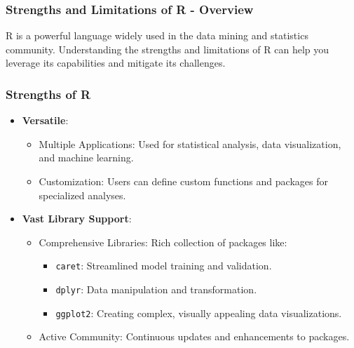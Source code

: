 \documentclass[aspectratio=169]{beamer}
\begin{document}
\begin{frame}[fragile]
    \frametitle{Strengths and Limitations of R - Overview}
    R is a powerful language widely used in the data mining and statistics community. 
    Understanding the strengths and limitations of R can help you leverage its capabilities and mitigate its challenges.
\end{frame}

\begin{frame}[fragile]
    \frametitle{Strengths of R}
    \begin{itemize}
        \item \textbf{Versatile}:
        \begin{itemize}
            \item Multiple Applications: Used for statistical analysis, data visualization, and machine learning.
            \item Customization: Users can define custom functions and packages for specialized analyses.
        \end{itemize}
        
        \item \textbf{Vast Library Support}:
        \begin{itemize}
            \item Comprehensive Libraries: Rich collection of packages like:
            \begin{itemize}
                \item \texttt{caret}: Streamlined model training and validation.
                \item \texttt{dplyr}: Data manipulation and transformation.
                \item \texttt{ggplot2}: Creating complex, visually appealing data visualizations.
            \end{itemize}
            \item Active Community: Continuous updates and enhancements to packages.
        \end{itemize}
    \end{itemize}
\end{frame}
\end{document}
